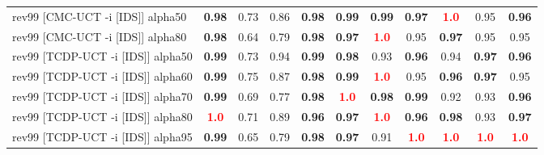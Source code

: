 \documentclass{article}
\begin{document}
\begin{tabular}{|l|r@{$\pm$}rr@{$\pm$}rr@{$\pm$}rr@{$\pm$}rr@{$\pm$}rr@{$\pm$}rr@{$\pm$}rr@{$\pm$}rr@{$\pm$}rr@{$\pm$}r|}
\hline
rev99 [CMC-UCT -i [IDS]] alpha50
& \multicolumn{2}{c}{\textbf{0.98}}
& \multicolumn{2}{c}{0.73}
& \multicolumn{2}{c}{0.86}
& \multicolumn{2}{c}{\textbf{0.98}}
& \multicolumn{2}{c}{\textbf{0.99}}
& \multicolumn{2}{c}{\textbf{0.99}}
& \multicolumn{2}{c}{\textbf{0.97}}
& \multicolumn{2}{c}{\textbf{\textcolor{red}{1.0}}}
& \multicolumn{2}{c}{0.95}
& \multicolumn{2}{c|}{\textbf{0.96}}
\\
rev99 [CMC-UCT -i [IDS]] alpha80
& \multicolumn{2}{c}{\textbf{0.98}}
& \multicolumn{2}{c}{0.64}
& \multicolumn{2}{c}{0.79}
& \multicolumn{2}{c}{\textbf{0.98}}
& \multicolumn{2}{c}{\textbf{0.97}}
& \multicolumn{2}{c}{\textbf{\textcolor{red}{1.0}}}
& \multicolumn{2}{c}{0.95}
& \multicolumn{2}{c}{\textbf{0.97}}
& \multicolumn{2}{c}{0.95}
& \multicolumn{2}{c|}{0.95}
\\
rev99 [TCDP-UCT -i [IDS]] alpha50
& \multicolumn{2}{c}{\textbf{0.99}}
& \multicolumn{2}{c}{0.73}
& \multicolumn{2}{c}{0.94}
& \multicolumn{2}{c}{\textbf{0.99}}
& \multicolumn{2}{c}{\textbf{0.98}}
& \multicolumn{2}{c}{0.93}
& \multicolumn{2}{c}{\textbf{0.96}}
& \multicolumn{2}{c}{0.94}
& \multicolumn{2}{c}{\textbf{0.97}}
& \multicolumn{2}{c|}{\textbf{0.96}}
\\
rev99 [TCDP-UCT -i [IDS]] alpha60
& \multicolumn{2}{c}{\textbf{0.99}}
& \multicolumn{2}{c}{0.75}
& \multicolumn{2}{c}{0.87}
& \multicolumn{2}{c}{\textbf{0.98}}
& \multicolumn{2}{c}{\textbf{0.99}}
& \multicolumn{2}{c}{\textbf{\textcolor{red}{1.0}}}
& \multicolumn{2}{c}{0.95}
& \multicolumn{2}{c}{\textbf{0.96}}
& \multicolumn{2}{c}{\textbf{0.97}}
& \multicolumn{2}{c|}{0.95}
\\
rev99 [TCDP-UCT -i [IDS]] alpha70
& \multicolumn{2}{c}{\textbf{0.99}}
& \multicolumn{2}{c}{0.69}
& \multicolumn{2}{c}{0.77}
& \multicolumn{2}{c}{\textbf{0.98}}
& \multicolumn{2}{c}{\textbf{\textcolor{red}{1.0}}}
& \multicolumn{2}{c}{\textbf{0.98}}
& \multicolumn{2}{c}{\textbf{0.99}}
& \multicolumn{2}{c}{0.92}
& \multicolumn{2}{c}{0.93}
& \multicolumn{2}{c|}{\textbf{0.96}}
\\
rev99 [TCDP-UCT -i [IDS]] alpha80
& \multicolumn{2}{c}{\textbf{\textcolor{red}{1.0}}}
& \multicolumn{2}{c}{0.71}
& \multicolumn{2}{c}{0.89}
& \multicolumn{2}{c}{\textbf{0.96}}
& \multicolumn{2}{c}{\textbf{0.97}}
& \multicolumn{2}{c}{\textbf{\textcolor{red}{1.0}}}
& \multicolumn{2}{c}{\textbf{0.96}}
& \multicolumn{2}{c}{\textbf{0.98}}
& \multicolumn{2}{c}{0.93}
& \multicolumn{2}{c|}{\textbf{0.97}}
\\
rev99 [TCDP-UCT -i [IDS]] alpha95
& \multicolumn{2}{c}{\textbf{0.99}}
& \multicolumn{2}{c}{0.65}
& \multicolumn{2}{c}{0.79}
& \multicolumn{2}{c}{\textbf{0.98}}
& \multicolumn{2}{c}{\textbf{0.97}}
& \multicolumn{2}{c}{0.91}
& \multicolumn{2}{c}{\textbf{\textcolor{red}{1.0}}}
& \multicolumn{2}{c}{\textbf{\textcolor{red}{1.0}}}
& \multicolumn{2}{c}{\textbf{\textcolor{red}{1.0}}}
& \multicolumn{2}{c|}{\textbf{\textcolor{red}{1.0}}}
\\
\hline
\end{tabular}%
\end{document}
